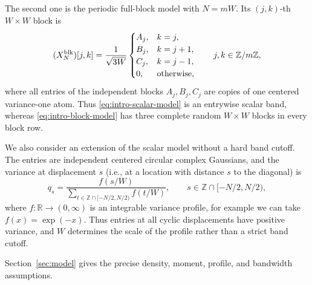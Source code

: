 \documentclass[11pt,reqno]{amsart}
\numberwithin{equation}{section}
\theoremstyle{definition}
\theoremstyle{remark}
\newcommand{\1}{\mathbf 1}
\begin{document}
The second one is the periodic full-block model with \(N=mW\).  Its \((j,k)\)-th
\(W\times W\) block is
\begin{equation}\label{eq:intro-block-model}
 (X_N^{\rm blk})[j,k]=\frac1{\sqrt{3W}}
 \begin{cases}
  A_j,&k=j,\\
  B_j,&k=j+1,\\
  C_j,&k=j-1,\\
  0,&\text{otherwise},
 \end{cases}
 \qquad j,k\in\mathbb Z/m\mathbb Z,
\end{equation}
where all entries of the independent blocks \(A_j,B_j,C_j\) are copies
of one centered variance-one atom.  Thus \eqref{eq:intro-scalar-model}
is an entrywise scalar band, whereas \eqref{eq:intro-block-model} has
three complete random \(W\times W\) blocks in every block row.  



We also consider an extension of the scalar model without a hard
band cutoff. The entries are independent centered circular complex
Gaussians, and the variance at displacement \(s\) (i.e., at a location with distance $s$ to the diagonal) is
\[
 q_s=\frac{f(s/W)}
 {\displaystyle\sum_{t\in\mathbb Z\cap[-N/2,N/2)}f(t/W)},
 \qquad s\in\mathbb Z\cap[-N/2,N/2),
\]
where \(f:\mathbb R\to(0,\infty)\) is an integrable variance profile,
for example we can take $f(x)=\exp(-x)$.
Thus entries at all cyclic displacements have positive variance,
and \(W\) determines the scale of the profile rather than a strict
band cutoff.


Section~\ref{sec:model} gives the
precise density, moment, profile, and bandwidth assumptions.
\end{document}
